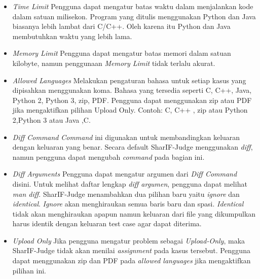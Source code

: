 \begin{itemize}
    \item \textit{Time Limit} \newline
    Pengguna dapat mengatur batas waktu dalam menjalankan kode dalam satuan milisekon. Program yang ditulis menggunakan Python dan Java biasanya lebih lambat dari C/C++. Oleh karena itu Python dan Java membutuhkan waktu yang lebih lama. \\
    \item \textit{Memory Limit} \newline
    Pengguna dapat mengatur batas memori dalam satuan kilobyte, namun penggunaan \textit{Memory Limit} tidak terlalu akurat.\\
    \item \textit{Allowed Languages} \newline
    Melakukan pengaturan bahasa untuk setiap kasus yang dipisahkan menggunakan koma. Bahasa yang tersedia seperti C, C++, Java, Python 2, Python 3, zip, PDF. Pengguna dapat menggunakan zip atau PDF jika mengaktifkan pilihan Upload Only. Contoh: C, C++ , zip atau Python 2,Python 3 atau Java ,C. \\
    \item \textit{Diff Command} \newline
    \textit{Command} ini digunakan untuk membandingkan keluaran dengan keluaran yang benar. Secara default SharIF-Judge menggunakan \textit{diff}, namun pengguna dapat mengubah \textit{command} pada bagian ini. \\
    \item \textit{Diff Arguments} \newline
    Pengguna dapat mengatur argumen dari \textit{Diff Command} disini. Untuk melihat daftar lengkap \textit{diff argumen}, pengguna dapat melihat \textit{man diff}. SharIF-Judge menambahkan dua pilihan baru yaitu \textit{ignore} dan \textit{identical}. \textit{Ignore} akan menghiraukan semua baris baru dan spasi. \textit{Identical} tidak akan menghiraukan apapun namun keluaran dari file yang dikumpulkan harus identik dengan keluaran test case agar dapat diterima. \\
    \item \textit{Upload Only} \newline
    Jika pengguna mengatur problem sebagai \textit{Upload-Only}, maka SharIF-Judge tidak akan menilai \textit{assignment} pada kasus tersebut. Pengguna dapat menggunakan zip dan PDF pada \textit{allowed languages} jika mengaktifkan pilihan ini.
\end{itemize}

